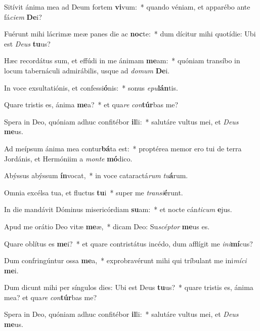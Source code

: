 \item Sitívit ánima mea ad Deum fortem \textbf{vi}vum:~* quando véniam, et apparébo ante fá\textit{ci}\textit{em} \textbf{De}i?
\item Fuérunt mihi lácrimæ meæ panes die ac \textbf{noc}te:~* dum dícitur mihi quotídie: Ubi est \textit{De}\textit{us} \textbf{tu}us?
\item Hæc recordátus sum, et effúdi in me ánimam \textbf{me}am:~* quóniam transíbo in locum tabernáculi admirábilis, usque ad \textit{do}\textit{mum} \textbf{De}i.
\item In voce exsultatiónis, et confessi\textbf{ó}nis:~* sonus \textit{e}\textit{pu}\textbf{lán}tis.
\item Quare tristis es, ánima \textbf{me}a?~* et qua\textit{re} \textit{con}\textbf{túr}bas me?
\item Spera in Deo, quóniam adhuc confitébor \textbf{il}li:~* salutáre vultus mei, et \textit{De}\textit{us} \textbf{me}us.
\item Ad meípsum ánima mea contur\textbf{bá}ta est:~* proptérea memor ero tui de terra Jordánis, et Hermóniim a \textit{mon}\textit{te} \textbf{mó}dico.
\item Abýssus abýssum \textbf{ín}vocat,~* in voce cataractá\textit{rum} \textit{tu}\textbf{á}rum.
\item Omnia excélsa tua, et fluctus \textbf{tu}i~* super me \textit{trans}\textit{i}\textbf{é}runt.
\item In die mandávit Dóminus misericórdiam \textbf{su}am:~* et nocte cán\textit{ti}\textit{cum} \textbf{e}jus.
\item Apud me orátio Deo vitæ \textbf{me}æ,~* dicam Deo: Su\textit{scép}\textit{tor} \textbf{me}us es.
\item Quare oblítus es \textbf{me}i?~* et quare contristátus incédo, dum afflígit me \textit{in}\textit{i}\textbf{mí}cus?
\item Dum confringúntur ossa \textbf{me}a,~* exprobravérunt mihi qui tríbulant me ini\textit{mí}\textit{ci} \textbf{me}i.
\item Dum dicunt mihi per síngulos dies: Ubi est Deus \textbf{tu}us?~* quare tristis es, ánima mea? et qua\textit{re} \textit{con}\textbf{túr}bas me?
\item Spera in Deo, quóniam adhuc confitébor \textbf{il}li:~* salutáre vultus mei, et \textit{De}\textit{us} \textbf{me}us.
